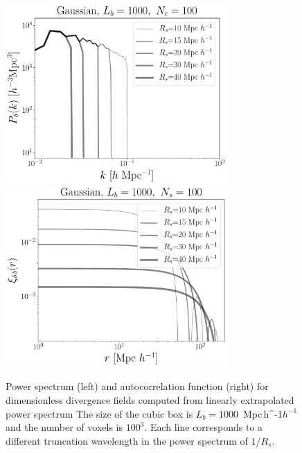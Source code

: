 \documentclass[usenatbib]{mnras}
\newcommand{\Mpch}{\,{\rm Mpc}\,\ifmmode h^{-1}\else $h^{-1}$\fi}
\begin{document}
\begin{figure}
    \centering
    \includegraphics[width=240pt]{power_spectrum_gauss_1000_100.pdf}
    \includegraphics[width=240pt]{corr_func_gauss_1000_100.pdf}
    \caption{Power spectrum (left) and autocorrelation function (right) for dimensionless divergence fields computed from linearly extrapolated power spectrum
    The size of the cubic box is $L_b=1000$ \Mpch and the number of voxels is $100^3$.
    Each line corresponds to a different truncation wavelength in the power spectrum of $1/R_s$.
    \label{fig:gaussian}}
\end{figure}
\end{document}
